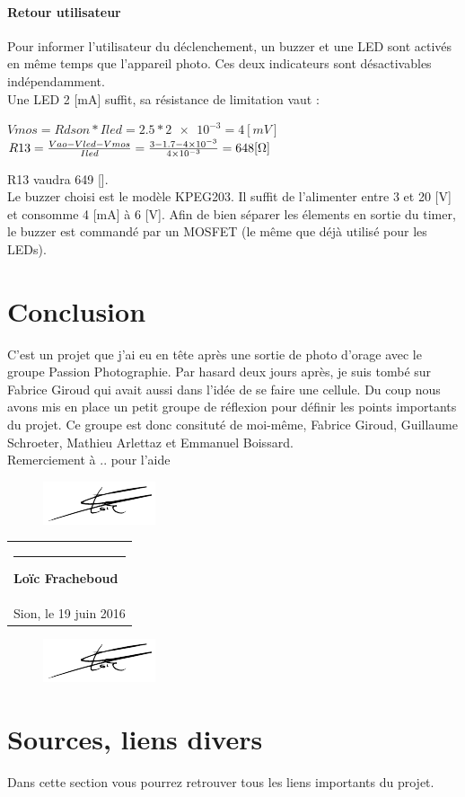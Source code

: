 \documentclass[a4paper,10pt]{article}
\newcommand{\signature}[2]{%
  \par\nobreak\bigskip
  \begin{singlespace}%
  \mbox{}\hfill\begin{tabular}{p{8cm} }
      \rule{8cm}{0.5pt}\newline{}%
        \textbf{#1}\\%
       #2 %
  \end{tabular}%
  \end{singlespace}%
  \medskip%
 }
\begin{document}
\paragraph{Retour utilisateur}
Pour informer l'utilisateur du déclenchement, un buzzer et une LED sont activés en même temps que l'appareil photo. Ces deux indicateurs sont désactivables indépendamment.\\
Une LED 2 [mA] suffit, sa résistance de limitation vaut :
\begin{center}
 $ Vmos = Rdson * Iled = 2.5*\num{2e-3} = 4 [mV] $
 $ R13 = \frac{Vao-Vled-Vmos}{Iled} = \frac{3-1.7-\num{4e-3}}{\num{4e-3}} = 648 [\ohm] $
\end{center}
R13 vaudra 649 [\ohm].\\
Le buzzer choisi est le modèle KPEG203. Il suffit de l'alimenter entre 3 et 20 [V] et consomme 4 [mA] à 6 [V]. Afin de bien séparer les élements en sortie du timer, le buzzer est commandé par un MOSFET (le même que déjà utilisé pour les LEDs).

 \pagebreak
 \section{Conclusion}
  C'est un projet que j'ai eu en tête après une sortie de photo d'orage avec le groupe Passion Photographie. Par hasard deux jours après, je suis tombé sur Fabrice Giroud qui avait aussi dans l'idée de se faire une cellule. Du coup nous avons mis en place un petit groupe de réflexion pour définir les points importants du projet. Ce groupe est donc consituté de moi-même, Fabrice Giroud, Guillaume Schroeter, Mathieu Arlettaz et Emmanuel Boissard.\\
 Remerciement à .. pour l'aide
 
 \begin{figure}
 \vspace{-52pt}
 \centering
 \includegraphics[scale=1]{signfracheboud}
 \end{figure}
 \signature{Loïc Fracheboud}{Sion, le 19 juin 2016} 
 
  \begin{figure}[!h]
 \centering
 \vspace{100pt}
 \includegraphics[scale=0.3]{images/signfracheboud}
 \end{figure}
 
 \pagebreak
 \section{Sources, liens divers}
 Dans cette section vous pourrez retrouver tous les liens importants du projet.
 
 
\end{document}
